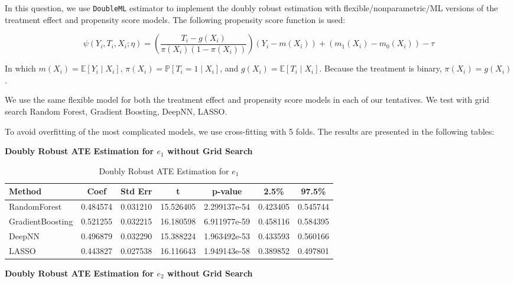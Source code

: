 \documentclass{article}
\begin{document}
In this question, we use \texttt{DoubleML} estimator to implement the doubly robust estimation with flexible/nonparametric/ML versions of the treatment effect and propensity score models. The following propensity score function is used:

$$
\psi(Y_i, T_i, X_i; \eta) = \left( \frac{T_i - g(X_i)}{\pi(X_i)(1 - \pi(X_i))} \right) (Y_i - m(X_i)) + \left( m_1(X_i) - m_0(X_i) \right) - \tau
$$

In which $m(X_i) = \mathbb{E}[Y_i \mid X_i]$, $\pi(X_i) = \mathbb{P}[T_i = 1 \mid X_i]$, and $g(X_i) = \mathbb{E}[T_i \mid X_i]$. Because the treatment is binary, $\pi(X_i) = g(X_i)$.

We use the same flexible model for both the treatment effect and propensity score models in each of our tentatives. We test with grid search Random Forest, Gradient Boosting, DeepNN, LASSO.

To avoid overfitting of the most complicated models, we use cross-fitting with 5 folds. The results are presented in the following tables:

\textbf{Doubly Robust ATE Estimation for $e_1$ without Grid Search}

\begin{table}[H]
  \centering
  \renewcommand{\arraystretch}{1.5}
  \begin{tabular}{|l|c|c|c|c|c|c|}
    \hline
    \textbf{Method} & \textbf{Coef} & \textbf{Std Err} & \textbf{t} & \textbf{p-value} & \textbf{2.5\%} & \textbf{97.5\%} \\
    \hline
    RandomForest & 0.484574 & 0.031210 & 15.526405 & 2.299137e-54 & 0.423405 & 0.545744 \\ \hline
    GradientBoosting & 0.521255 & 0.032215 & 16.180598 & 6.911977e-59 & 0.458116 & 0.584395 \\ \hline
    DeepNN & 0.496879 & 0.032290 & 15.388224 & 1.963492e-53 & 0.433593 & 0.560166 \\ \hline
    LASSO & 0.443827 & 0.027538 & 16.116643 & 1.949143e-58 & 0.389852 & 0.497801 \\ \hline
  \end{tabular}
  \caption{Doubly Robust ATE Estimation for $e_1$}
\end{table}

\textbf{Doubly Robust ATE Estimation for $e_2$ without Grid Search}
\end{document}
